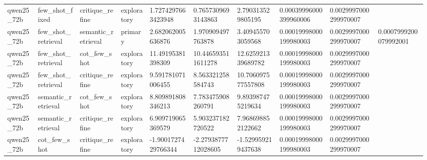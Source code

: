 \begin{tabular}{llllllllll}
qwen25\_72b & few\_shot\_fixed & critique\_refine & exploratory & 1.7274297663423948 & 0.7657309693143863 & 2.790313529805195 & 0.00039996000399960006 & 0.0029997000299970007 &  \\
qwen25\_72b & few\_shot\_retrieval & semantic\_retrieval & primary & 2.682062005636876 & 1.970909497763878 & 3.409455703059568 & 0.00019998000199980003 & 0.0029997000299970007 & 0.0007999200079992001 \\
qwen25\_72b & few\_shot\_retrieval & cot\_few\_shot & exploratory & 11.49195381398309 & 10.446593511611278 & 12.625921339689782 & 0.00019998000199980003 & 0.0029997000299970007 &  \\
qwen25\_72b & few\_shot\_retrieval & critique\_refine & exploratory & 9.591781071006455 & 8.563321258584743 & 10.706097577557808 & 0.00019998000199980003 & 0.0029997000299970007 &  \\
qwen25\_72b & semantic\_retrieval & cot\_few\_shot & exploratory & 8.809891808346213 & 7.783475908260791 & 9.893987475219634 & 0.00019998000199980003 & 0.0029997000299970007 &  \\
qwen25\_72b & semantic\_retrieval & critique\_refine & exploratory & 6.909719065369579 & 5.903237182720522 & 7.968698852122662 & 0.00019998000199980003 & 0.0029997000299970007 &  \\
qwen25\_72b & cot\_few\_shot & critique\_refine & exploratory & -1.9001727429766344 & -2.2793877712028605 & -1.529959219437638 & 0.00019998000199980003 & 0.0029997000299970007 &  \\
\hline
\end{tabular}

